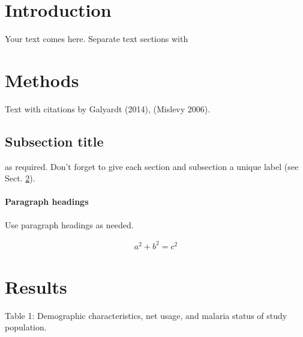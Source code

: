 \documentclass[smallextended]{svjour3}       %
\begin{document}
\def\spacingset#1{\renewcommand{\baselinestretch}%
{#1}\small\normalsize} \spacingset{1}


\section{Introduction}\label{intro}

Your text comes here. Separate text sections with

\section{Methods}\label{sec:methods}

Text with citations by Galyardt (2014), (Mislevy 2006).

\subsection{Subsection title}\label{sec:methodssub1}

as required. Don't forget to give each section and subsection a unique
label (see Sect. \ref{sec:methods}).

\paragraph{Paragraph headings}\label{paragraph-headings}

Use paragraph headings as needed.

\begin{align}
a^2+b^2=c^2
\end{align}

\section{Results}\label{sec:results}

Table 1: Demographic characteristics, net usage, and malaria status of
study population.

\end{document}
